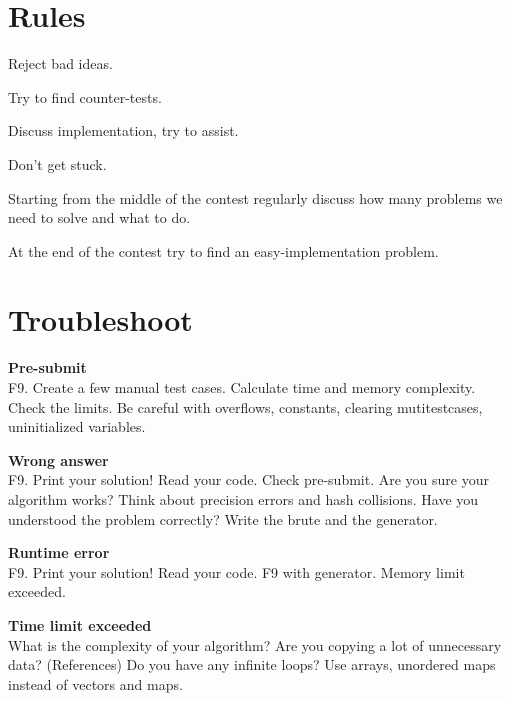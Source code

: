 \section{Rules}
Reject bad ideas.

Try to find counter-tests.

Discuss implementation, try to assist.

Don't get stuck.

Starting from the middle of the contest regularly discuss how many problems we need to solve and what to do.

At the end of the contest try to find an easy-implementation problem.

\section{Troubleshoot}
\textbf{Pre-submit}\\
F9.
Create a few manual test cases.
Calculate time and memory complexity. Check the limits.
Be careful with overflows, constants,
clearing mutitestcases, uninitialized variables.

\textbf{Wrong answer}\\
F9.
Print your solution!
Read your code.
Check pre-submit.
Are you sure your algorithm works?
Think about precision errors and hash collisions.
Have you understood the problem correctly?
Write the brute and the generator.

\textbf{Runtime error}\\
F9.
Print your solution!
Read your code.
F9 with generator.
Memory limit exceeded.

\textbf{Time limit exceeded}\\
What is the complexity of your algorithm?
Are you copying a lot of unnecessary data? (References)
Do you have any infinite loops?
Use arrays, unordered maps instead of vectors and maps.
